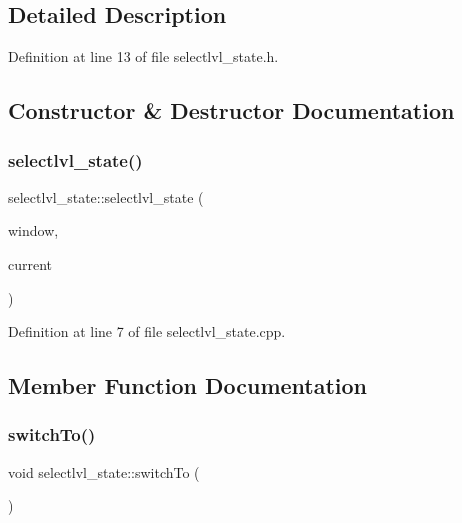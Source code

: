 \subsection{Detailed Description}


Definition at line 13 of file selectlvl\+\_\+state.\+h.



\subsection{Constructor \& Destructor Documentation}
\hypertarget{classselectlvl__state_aa346a0911b033538037fdd4f11258cf3}{}\label{classselectlvl__state_aa346a0911b033538037fdd4f11258cf3} 
\subsubsection{\texorpdfstring{selectlvl\+\_\+state()}{selectlvl\_state()}}
{\footnotesize\ttfamily selectlvl\+\_\+state\+::selectlvl\+\_\+state (\begin{DoxyParamCaption}\item[{sf\+::\+Render\+Window \&}]{window,  }\item[{int}]{current }\end{DoxyParamCaption})}



Definition at line 7 of file selectlvl\+\_\+state.\+cpp.



\subsection{Member Function Documentation}
\hypertarget{classselectlvl__state_a73150e2cbfe869b038d28bebfaf3c8b7}{}\label{classselectlvl__state_a73150e2cbfe869b038d28bebfaf3c8b7} 
\subsubsection{\texorpdfstring{switch\+To()}{switchTo()}}
{\footnotesize\ttfamily void selectlvl\+\_\+state\+::switch\+To (\begin{DoxyParamCaption}{ }\end{DoxyParamCaption})}



